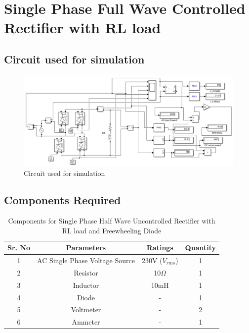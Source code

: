 \section{Single Phase Full Wave Controlled Rectifier with RL load}

\subsection{Circuit used for simulation}

\begin{figure}[h]
    \centering
    \includegraphics[width=1\textwidth]{images/experiment-2/circuit-diagram-simulation-03.png}
    \caption{Circuit used for simulation}
    \label{Fig_simulation_circuit_single-phase-full-wave-controlled-rectifier-with-RL-load}
\end{figure}

\subsection{Components Required}

\begin{table}[h]
    \renewcommand{\arraystretch}{1.3}
    \label{table_components_required_circuit_3}
    \centering
    \begin{tabular}{|c|c|c|c|}
        \hline
        Sr. No & Parameters                     & Ratings            & Quantity \\
        \hline
        \hline
        1      & AC Single Phase Voltage Source & 230V ($ V_{rms} $) & 1        \\
        \hline
        2      & Resistor                       & 10$ \Omega $       & 1        \\
        \hline
        3      & Inductor                       & 10mH               & 1        \\
        \hline
        4      & Diode                          & -                  & 1        \\
        \hline
        5      & Voltmeter                      & -                  & 2        \\
        \hline
        6      & Ammeter                        & -                  & 1        \\
        \hline
    \end{tabular}
    \caption{Components for Single Phase Half Wave Uncontrolled Rectifier with RL load and Freewheeling Diode}
\end{table}


